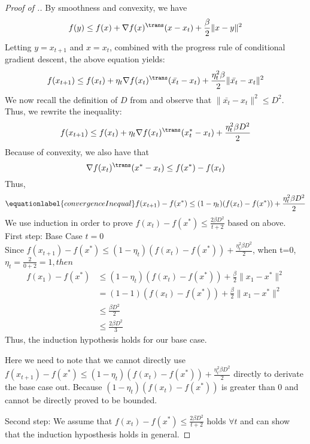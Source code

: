 \begin{proof}[Proof of .]
By smoothness and convexity, we have
$$ f(y) \leq f(x) +\nabla f(x) ^\trans (x-x_t) + \frac{\beta}{2} \| x-y \| ^2 $$
Letting $ y = x_{t+1} $ and $x= x_t$, combined with the progress rule of conditional gradient descent, the above equation yields:
$$ f(x_{t+1}) \leq f(x_t) + \eta_t \nabla f(x_t) ^\trans (\bar{x_t} - x_t) + \frac{\eta_t^2\beta}{2} \| \bar{x_t} - x_t \| ^2 $$
We now recall the definition of $D$ from  and observe that $\| \bar{x_t} - x_t \| ^2 \leq D^2$. Thus, we rewrite the inequality:
$$ f(x_{t+1}) \leq f(x_t) + \eta_t \nabla f(x_t) ^\trans (x_t^* - x_t) + \frac{\eta_t^2\beta D ^2}{2} $$
Because of convexity, we also have that
$$ \nabla f(x_t) ^\trans (x^*-x_t) \leq f(x^*) - f(x_t) $$
Thus,
\begin{equation}\equationlabel{convergenceInequal}
f(x_{t+1})-f(x^*) \leq (1-\eta_t)(f(x_t)-f(x^*)) + \frac{\eta_t^2\beta D ^2}{2}
\end{equation}
We use induction in order to prove $f(x_t)-f(x^*) \leq \frac{2\beta D^2}{t+2}$  based on  above.\\
First step: Base Case $t=0$ \\
Since $ f(x_{t+1})-f(x^*) \leq (1-\eta_t)(f(x_t)-f(x^*)) + \frac{\eta_t^2\beta D ^2}{2}$, when t=0, $\eta_t =\frac{2}{0+2}=1, then $
\begin{align*} f(x_1)-f(x^*) &\leq (1-\eta_t)(f(x_t)-f(x^*)) + \frac{\beta}{2}\| x_1-x^* \|^2 \\
&= (1-1)(f(x_t)-f(x^*)) + \frac{\beta}{2}\| x_1-x^* \|^2 \\
&\leq \frac{\beta D^2}{2}\\
&\leq \frac{2\beta D^2}{3}
\end{align*}
Thus, the induction hypothesis holds for our base case.

Here we need to note that we cannot directly use $f(x_{t+1})-f(x^*) \leq (1-\eta_t)(f(x_t)-f(x^*)) + \frac{\eta_t^2\beta D ^2}{2}$ directly to derivate the base case out. Because $(1-\eta_t)(f(x_t)-f(x^*))$ is greater than 0 and cannot be directly proved to be bounded.

Second step: We assume that $f(x_t)-f(x^*) \leq \frac{2\beta D^2}{t+2}$ holds $\forall t$ and can show that the induction hyposthesis holds in general.


\end{proof}
